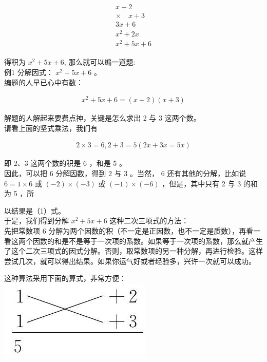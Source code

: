 \documentclass[10pt]{article}
\begin{document}
\begin{align*}
\begin{array}{r}
x+2 \\
\times \quad x+3 \\
\hline 3 x+6 \\
\hline x^{2}+2 x \\
\hline x^{2}+5 x+6
\end{array}
\end{align*}

得积为 $x^{2}+5 x+6$, 那么就可以编一道题:\\
例1 分解因式： $x^{2}+5 x+6$ 。\\
编题的人早已心中有数：

\begin{align*}
x^{2}+5 x+6=(x+2)(x+3) \tag{1}
\end{align*}

解题的人解起来要费点神，关键是怎么求出 2 与 3 这两个数。\\
请看上面的坚式乘法，我们有

\begin{align*}
2 \times 3=6,2+3=5(2 x+3 x=5 x)
\end{align*}

即 $2 、 3$ 这两个数的积是 6 ，和是 5 。\\
因此，可以把 6 分解因数，得到 2 与 3 。当然， 6 还有其他的分解，比如说 $6=1 \times 6$ 或 $(-2) \times(-3)$ 或 $(-1) \times(-6)$ ，但是，其中只有 2 与 3 的和为 5 ，所

以结果是（1）式。\\
于是，我们得到分解 $x^{2}+5 x+6$ 这种二次三项式的方法：\\
先把常数项 6 分解为两个因数的积（不一定是正因数，也不一定是质数），再看一看这两个因数的和是不是等于一次项的系数。如果等于一次项的系数，那么就产生了这个二次三项式的因式分解。否则，取常数项的另一种分解，再进行检验。这样尝试几次，就可以得出结果。如果你运气好或者经验多，兴许一次就可以成功。

这种算法采用下面的算式，非常方便：\\
\includegraphics[max width=\textwidth, center]{2024_10_30_bd799899fef40368a068g-035}
\end{document}
